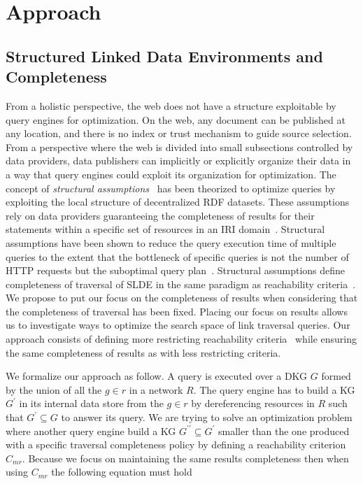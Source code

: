 \section{Approach}



\subsection{Structured Linked Data Environments and Completeness}\label{sec:slde}
From a holistic perspective, the web does not have a structure exploitable by query engines for optimization.
On the web, any document can be published at any location, and there is no index or trust mechanism to guide source selection.
From a perspective where the web is divided into small subsections controlled by data providers, data publishers can implicitly or explicitly organize their data  
in a way that query engines could exploit its organization for optimization.
The concept of \emph{structural assumptions}~\cite{Taelman2023} has been theorized to optimize queries by exploiting the local structure of decentralized RDF datasets.
These assumptions rely on data providers guaranteeing the completeness of results for their statements within a specific set of resources in an IRI domain~\cite{Bogaerts2021LinkTW}.
Structural assumptions have been shown to reduce the query execution time of multiple queries to the extent that the bottleneck of specific queries is not the number of HTTP requests but the suboptimal query plan~\cite{Taelman2023, eschauzier_quweda_linkqueue_2023}.
Structural assumptions define completeness of traversal of SLDE in the same paradigm as reachability criteria~\cite{Hartig2012}.
We propose to put our focus on the completeness of results when considering that the completeness of traversal has been fixed.
Placing our focus on results allows us to investigate ways to optimize the search space of link traversal queries.
Our approach consists of defining more restricting reachability criteria~\cite{Hartig2012} while ensuring the same completeness of results as with less restricting criteria.

We formalize our approach as follow.
A query is executed over a DKG $G$ formed by the union of all the $g \in r$ in a network $R$.
The query engine has to build a KG $G^{\prime}$ in its internal data store from the  $g \in r$ by dereferencing resources in $R$ such that
$G^{\prime} \subseteq G$ to answer its query.
We are trying to solve an optimization problem where another query engine build a KG
$G^{\prime\prime} \subseteq G^{\prime}$
smaller than the one produced with a specific traversal completeness policy
by defining a reachability criterion $C_{mr}$.
Because we focus on maintaining the same results completeness then when using $C_{mr}$ the following equation must hold

